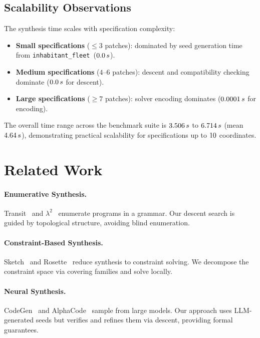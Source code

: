 \documentclass[11pt]{article}
\newcommand{\InhabFleet}{\texttt{inhabitant\_fleet}}
\begin{document}
\subsection{Scalability Observations}

The synthesis time scales with specification complexity:
\begin{itemize}[noitemsep]
  \item \textbf{Small specifications} ($\leq 3$ patches): dominated
        by seed generation time from \InhabFleet\
        ($0.0\,s$).
  \item \textbf{Medium specifications} ($4$--$6$ patches): descent
        and compatibility checking dominate
        ($0.0\,s$ for descent).
  \item \textbf{Large specifications} ($\geq 7$ patches): solver
        encoding dominates ($0.0001\,s$ for
        encoding).
\end{itemize}
The overall time range across the benchmark suite is
$3.506\,s$ to $6.714\,s$ (mean $4.64\,s$),
demonstrating practical scalability for specifications up to
$10$ coordinates.

\section{Related Work}\label{sec:related}

\paragraph{Enumerative Synthesis.}
Transit~\cite{Udupa2013} and $\lambda^2$~\cite{Feser2015} enumerate
programs in a grammar.  Our descent search is guided by topological
structure, avoiding blind enumeration.

\paragraph{Constraint-Based Synthesis.}
Sketch~\cite{Solar-Lezama2008} and Rosette~\cite{Torlak2013} reduce
synthesis to constraint solving.  We decompose the constraint space
via covering families and solve locally.

\paragraph{Neural Synthesis.}
CodeGen~\cite{CodeGen2022} and AlphaCode~\cite{Li2022} sample from
large models.  Our approach uses LLM-generated seeds but verifies and
refines them via descent, providing formal guarantees.
\end{document}
